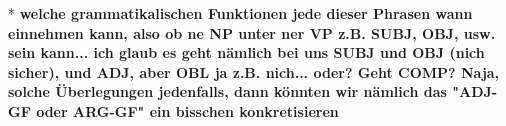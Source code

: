\documentclass[12pt,a4paper]{article}
\begin{document}

* \textbf{welche grammatikalischen Funktionen jede dieser Phrasen wann einnehmen kann, also  ob ne NP unter ner VP z.B. SUBJ, OBJ, usw. sein kann... ich glaub es geht nämlich bei uns SUBJ und OBJ (nich sicher), und ADJ, aber OBL ja z.B. nich... oder? Geht COMP? Naja, solche Überlegungen jedenfalls, dann könnten wir nämlich das "ADJ-GF oder ARG-GF" ein bisschen konkretisieren}
\end{document}
